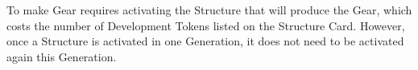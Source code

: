 To make Gear requires activating the Structure that will produce the Gear, which costs the number of Development Tokens listed on the Structure Card. However, once a Structure is activated in one Generation, it does not need to be activated again this Generation. 
